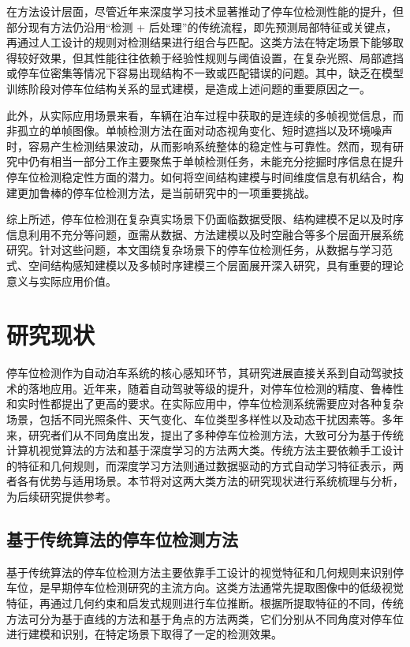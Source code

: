 在方法设计层面，尽管近年来深度学习技术显著推动了停车位检测性能的提升，但部分现有方法仍沿用“检测 + 后处理”的传统流程，即先预测局部特征或关键点，再通过人工设计的规则对检测结果进行组合与匹配。这类方法在特定场景下能够取得较好效果，但其性能往往依赖于经验性规则与阈值设置，在复杂光照、局部遮挡或停车位密集等情况下容易出现结构不一致或匹配错误的问题。其中，缺乏在模型训练阶段对停车位结构关系的显式建模，是造成上述问题的重要原因之一。

此外，从实际应用场景来看，车辆在泊车过程中获取的是连续的多帧视觉信息，而非孤立的单帧图像。单帧检测方法在面对动态视角变化、短时遮挡以及环境噪声时，容易产生检测结果波动，从而影响系统整体的稳定性与可靠性。然而，现有研究中仍有相当一部分工作主要聚焦于单帧检测任务，未能充分挖掘时序信息在提升停车位检测稳定性方面的潜力。如何将空间结构建模与时间维度信息有机结合，构建更加鲁棒的停车位检测方法，是当前研究中的一项重要挑战。

综上所述，停车位检测在复杂真实场景下仍面临数据受限、结构建模不足以及时序信息利用不充分等问题，亟需从数据、方法建模以及时空融合等多个层面开展系统研究。针对这些问题，本文围绕复杂场景下的停车位检测任务，从数据与学习范式、空间结构感知建模以及多帧时序建模三个层面展开深入研究，具有重要的理论意义与实际应用价值。


\section{研究现状}

停车位检测作为自动泊车系统的核心感知环节，其研究进展直接关系到自动驾驶技术的落地应用。近年来，随着自动驾驶等级的提升，对停车位检测的精度、鲁棒性和实时性都提出了更高的要求。在实际应用中，停车位检测系统需要应对各种复杂场景，包括不同光照条件、天气变化、车位类型多样性以及动态干扰因素等。多年来，研究者们从不同角度出发，提出了多种停车位检测方法，大致可分为基于传统计算机视觉算法的方法和基于深度学习的方法两大类。传统方法主要依赖手工设计的特征和几何规则，而深度学习方法则通过数据驱动的方式自动学习特征表示，两者各有优势与适用场景。本节将对这两大类方法的研究现状进行系统梳理与分析，为后续研究提供参考。

\subsection{基于传统算法的停车位检测方法}

基于传统算法的停车位检测方法主要依靠手工设计的视觉特征和几何规则来识别停车位，是早期停车位检测研究的主流方向。这类方法通常先提取图像中的低级视觉特征，再通过几何约束和启发式规则进行车位推断。根据所提取特征的不同，传统方法可分为基于直线的方法和基于角点的方法两类，它们分别从不同角度对停车位进行建模和识别，在特定场景下取得了一定的检测效果。

